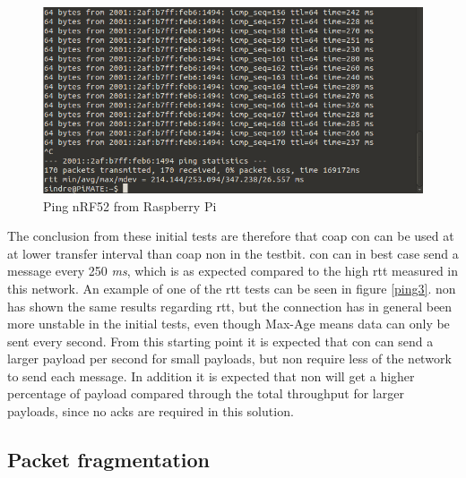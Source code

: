 \begin{figure}[ht]
    \centering
    \includegraphics[width=1.0\textwidth]{ping4.png}    
    \caption{Ping nRF52 from Raspberry Pi}
    \label{fig:ping3}
\end{figure}


\noindent The conclusion from these initial tests are therefore that \gls{coap} \gls{con} can be used at at lower transfer interval than \gls{coap} \gls{non} in the testbit. \gls{con} can in best case send a message every 250 \textit{ms}, which is as expected compared to the high \gls{rtt} measured in this network. An example of one of the \gls{rtt} tests can be seen in figure \ref{ping3}. \gls{non} has shown the same results regarding \gls{rtt}, but the connection has in general been more unstable in the initial tests, even though Max-Age means data can only be sent every second. From this starting point it is expected that \gls{con} can send a larger \gls{payload} per second for small \glspl{payload}, but \gls{non} require less of the network to send each message. In addition it is expected that \gls{non} will get a higher percentage of \gls{payload} compared through the total throughput for larger \glspl{payload}, since no \glspl{ack} are required in this solution. 



\subsection{Packet fragmentation}

